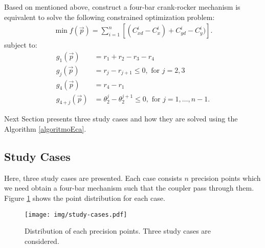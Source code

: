 \documentclass[12pt,letterpape]{article}
\begin{document}
Based on mentioned above, construct a four-bar crank-rocker mechanism is equivalent
to solve the following constrained optimization problem:
% 
\begin{align}
	\min f(\vec{p}) = \sum_{i=1}^n \left[ (C_{xd}^i - C_x^i) + C_{yd}^i - C_y^i) \right].
	\label{eqn:objfun1}
\end{align}
% 
subject to: 
% 
\begin{align}
 \label{eqn:g1}
 g_1( \vec{p})  & = r_1 + r_2 - r_3 - r_4 \\
 g_j(\vec{p})   & = r_j -  r_{j+1} \leq 0, \text{ for } j = 2, 3 \\
 \label{eqn:g4}
 g_4(\vec{p})   & = r_4 - r_1 \\
 g_{4 + j } (\vec{p})   & = \theta_{2}^j - \theta_{2}^{j+1} \leq 0,  \text{ for } j = 1, \ldots, n-1.
 \label{eqn:COPtheta} 
\end{align}
%

Next Section presents three study cases and how they are solved using the Algorithm
\ref{algoritmoEca}.

\subsection{Study Cases} %
\label{sub:study_cases}

Here, three study cases are presented. Each case consists $n$ precision points which
we need obtain a four-bar mechanism such that the coupler pass through them. Figure
\ref{fig:studycases} shows the point distribution for each case.

\begin{figure}[!ht]
	\centering
	\texttt{[image: img/study-cases.pdf]}
	\caption{Distribution of each precision points. Three study cases are considered.}
	\label{fig:studycases}
\end{figure}
\end{document}
